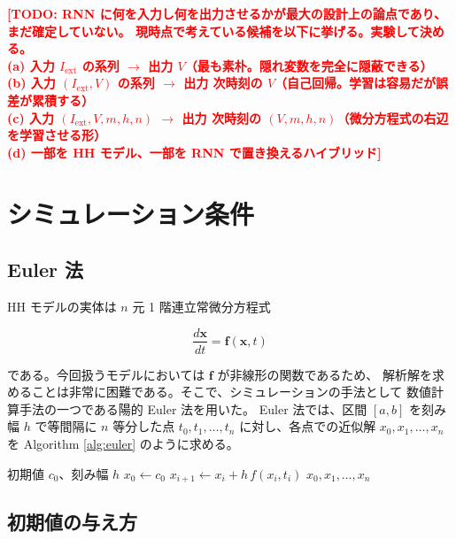 \documentclass[a4paper,11pt,openany]{ltjsreport}
\newcommand{\TODO}[1]{\textcolor{red}{\textbf{[TODO: #1]}}}
\newcommand{\Iext}{I_{\mathrm{ext}}}
\begin{document}
\TODO{RNN に何を入力し何を出力させるかが最大の設計上の論点であり、まだ確定していない。
      現時点で考えている候補を以下に挙げる。実験して決める。\\
      (a) 入力 $\Iext$ の系列 $\to$ 出力 $V$（最も素朴。隠れ変数を完全に隠蔽できる）\\
      (b) 入力 $(\Iext, V)$ の系列 $\to$ 出力 次時刻の $V$（自己回帰。学習は容易だが誤差が累積する）\\
      (c) 入力 $(\Iext, V, m, h, n)$ $\to$ 出力 次時刻の $(V, m, h, n)$（微分方程式の右辺を学習させる形）\\
      (d) 一部を HH モデル、一部を RNN で置き換えるハイブリッド}

\section{シミュレーション条件}
\label{sec:sim_cond}

\subsection{Euler 法}

HH モデルの実体は $n$ 元 1 階連立常微分方程式

\begin{equation}
  \frac{d\bm{x}}{dt} = \bm{f}(\bm{x}, t)
  \label{eq:ode}
\end{equation}

である。今回扱うモデルにおいては $\bm{f}$ が非線形の関数であるため、
解析解を求めることは非常に困難である。そこで、シミュレーションの手法として
数値計算手法の一つである陽的 Euler 法を用いた。
Euler 法では、区間 $[a,b]$ を刻み幅 $h$ で等間隔に $n$ 等分した点
$t_0, t_1, \dots, t_n$ に対し、各点での近似解 $x_0, x_1, \dots, x_n$ を
Algorithm \ref{alg:euler} のように求める\cite{minemura2008}。

\begin{algorithm}[htbp]
  \caption{Euler 法}
  \label{alg:euler}
  \begin{algorithmic}[1]
    \Require 初期値 $c_0$、刻み幅 $h$
    \State $x_0 \gets c_0$
      \State $x_{i+1} \gets x_i + h\, f(x_i, t_i)$
    \EndFor
    \State \Return $x_0, x_1, \dots, x_n$
  \end{algorithmic}
\end{algorithm}

\subsection{初期値の与え方}
\end{document}
